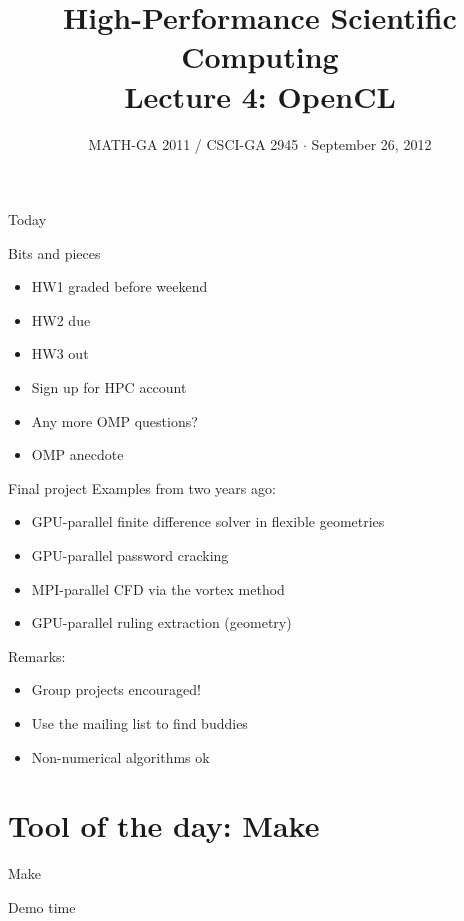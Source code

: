 \documentclass[english,compress]{beamer}
\begin{document}

\title{High-Performance Scientific Computing\\Lecture 4: OpenCL}

\date{MATH-GA 2011 / CSCI-GA 2945 $\cdot$ September 26, 2012}

\frame{\titlepage}

\begin{frame}{Today}
  \tableofcontents[hideallsubsections]
\end{frame}
\begin{frame}{Bits and pieces}
  \begin{itemize}
    \item HW1 graded before weekend
    \item HW2 due
    \item HW3 out
    \item Sign up for HPC account
    \item Any more OMP questions?
    \item OMP anecdote
  \end{itemize}
\end{frame}
\begin{frame}{Final project}
  Examples from two years ago:
  \begin{itemize}
    \item GPU-parallel finite difference solver in flexible geometries
    \item GPU-parallel password cracking
    \item MPI-parallel CFD via the vortex method
    \item GPU-parallel ruling extraction (geometry)
  \end{itemize}
  Remarks:
  \begin{itemize}
    \item Group projects encouraged!
    \item Use the mailing list to find buddies
    \item Non-numerical algorithms ok
  \end{itemize}
\end{frame}
\section{Tool of the day: Make}
\begin{frame}{Make}
  \begin{center}
  \Huge Demo time
  \end{center}
\end{frame}
\end{document}
